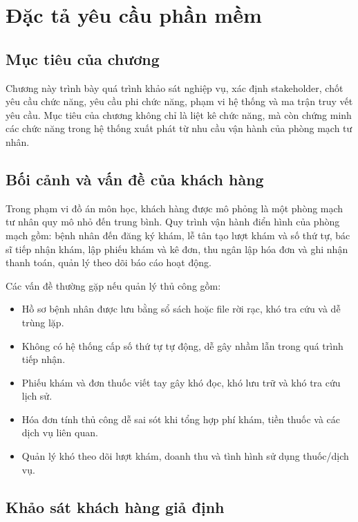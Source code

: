 \chapter{Đặc tả yêu cầu phần mềm}

\section{Mục tiêu của chương}

Chương này trình bày quá trình khảo sát nghiệp vụ, xác định stakeholder, chốt yêu cầu chức năng, yêu cầu phi chức năng, phạm vi hệ thống và ma trận truy vết yêu cầu. Mục tiêu của chương không chỉ là liệt kê chức năng, mà còn chứng minh các chức năng trong hệ thống xuất phát từ nhu cầu vận hành của phòng mạch tư nhân.

\section{Bối cảnh và vấn đề của khách hàng}

Trong phạm vi đồ án môn học, khách hàng được mô phỏng là một phòng mạch tư nhân quy mô nhỏ đến trung bình. Quy trình vận hành điển hình của phòng mạch gồm: bệnh nhân đến đăng ký khám, lễ tân tạo lượt khám và số thứ tự, bác sĩ tiếp nhận khám, lập phiếu khám và kê đơn, thu ngân lập hóa đơn và ghi nhận thanh toán, quản lý theo dõi báo cáo hoạt động.

Các vấn đề thường gặp nếu quản lý thủ công gồm:

\begin{itemize}
    \item Hồ sơ bệnh nhân được lưu bằng sổ sách hoặc file rời rạc, khó tra cứu và dễ trùng lặp.
    \item Không có hệ thống cấp số thứ tự tự động, dễ gây nhầm lẫn trong quá trình tiếp nhận.
    \item Phiếu khám và đơn thuốc viết tay gây khó đọc, khó lưu trữ và khó tra cứu lịch sử.
    \item Hóa đơn tính thủ công dễ sai sót khi tổng hợp phí khám, tiền thuốc và các dịch vụ liên quan.
    \item Quản lý khó theo dõi lượt khám, doanh thu và tình hình sử dụng thuốc/dịch vụ.
\end{itemize}

\section{Khảo sát khách hàng giả định}

